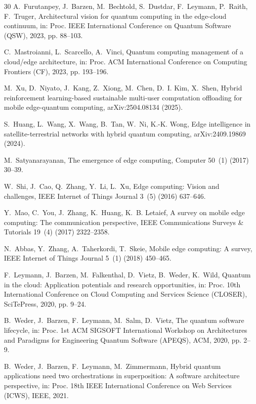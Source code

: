 \begin{thebibliography}{30}
A.~Furutanpey, J.~Barzen, M.~Bechtold, S.~Dustdar, F.~Leymann, P.~Raith,
F.~Truger,
Architectural vision for quantum computing in the edge-cloud continuum,
in: Proc. IEEE International Conference on Quantum Software (QSW), 2023,
pp. 88--103.

C.~Mastroianni, L.~Scarcello, A.~Vinci,
Quantum computing management of a cloud/edge architecture,
in: Proc. ACM International Conference on Computing Frontiers (CF), 2023,
pp. 193--196.

M.~Xu, D.~Niyato, J.~Kang, Z.~Xiong, M.~Chen, D.~I. Kim, X.~Shen,
Hybrid reinforcement learning-based sustainable multi-user computation
offloading for mobile edge-quantum computing,
arXiv:2504.08134 (2025).

S.~Huang, L.~Wang, X.~Wang, B.~Tan, W.~Ni, K.-K. Wong,
Edge intelligence in satellite-terrestrial networks with hybrid quantum
computing,
arXiv:2409.19869 (2024).

M.~Satyanarayanan,
The emergence of edge computing,
Computer 50~(1) (2017) 30--39.

W.~Shi, J.~Cao, Q.~Zhang, Y.~Li, L.~Xu,
Edge computing: Vision and challenges,
IEEE Internet of Things Journal 3~(5) (2016) 637--646.

Y.~Mao, C.~You, J.~Zhang, K.~Huang, K.~B. Letaief,
A survey on mobile edge computing: The communication perspective,
IEEE Communications Surveys \& Tutorials 19~(4) (2017) 2322--2358.

N.~Abbas, Y.~Zhang, A.~Taherkordi, T.~Skeie,
Mobile edge computing: A survey,
IEEE Internet of Things Journal 5~(1) (2018) 450--465.

F.~Leymann, J.~Barzen, M.~Falkenthal, D.~Vietz, B.~Weder, K.~Wild,
Quantum in the cloud: Application potentials and research opportunities,
in: Proc. 10th International Conference on Cloud Computing and Services Science
(CLOSER), SciTePress, 2020, pp. 9--24.

B.~Weder, J.~Barzen, F.~Leymann, M.~Salm, D.~Vietz,
The quantum software lifecycle,
in: Proc. 1st ACM SIGSOFT International Workshop on Architectures and Paradigms
for Engineering Quantum Software (APEQS), ACM, 2020, pp. 2--9.

B.~Weder, J.~Barzen, F.~Leymann, M.~Zimmermann,
Hybrid quantum applications need two orchestrations in superposition: A software
architecture perspective,
in: Proc. 18th IEEE International Conference on Web Services (ICWS), IEEE, 2021.


\end{thebibliography}
